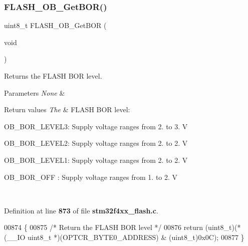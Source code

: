 \subsubsection{F\+L\+A\+S\+H\+\_\+\+O\+B\+\_\+\+Get\+B\+O\+R()}
{\footnotesize\ttfamily uint8\+\_\+t F\+L\+A\+S\+H\+\_\+\+O\+B\+\_\+\+Get\+B\+OR (\begin{DoxyParamCaption}\item[{void}]{ }\end{DoxyParamCaption})}



Returns the F\+L\+A\+SH B\+OR level. 


\begin{DoxyParams}{Parameters}
{\em None} & \\
\hline
\end{DoxyParams}

\begin{DoxyRetVals}{Return values}
{\em The} & F\+L\+A\+SH B\+OR level\+:
\begin{DoxyItemize}
\item O\+B\+\_\+\+B\+O\+R\+\_\+\+L\+E\+V\+E\+L3\+: Supply voltage ranges from 2. to 3. V
\item O\+B\+\_\+\+B\+O\+R\+\_\+\+L\+E\+V\+E\+L2\+: Supply voltage ranges from 2. to 2. V
\item O\+B\+\_\+\+B\+O\+R\+\_\+\+L\+E\+V\+E\+L1\+: Supply voltage ranges from 2. to 2. V
\item O\+B\+\_\+\+B\+O\+R\+\_\+\+O\+FF \+: Supply voltage ranges from 1. to 2. V 
\end{DoxyItemize}\\
\hline
\end{DoxyRetVals}


Definition at line \textbf{ 873} of file \textbf{ stm32f4xx\+\_\+flash.\+c}.


\begin{DoxyCode}
00874 \{
00875   \textcolor{comment}{/* Return the FLASH BOR level */}
00876   \textcolor{keywordflow}{return} (uint8\_t)(*(\_\_IO uint8\_t *)(OPTCR_BYTE0_ADDRESS) & (uint8\_t)0x0C);
00877 \}
\end{DoxyCode}
\mbox{\label{group__FLASH__Group3_ga2f0151c6c923396eaf96c554a5860c31}} 
